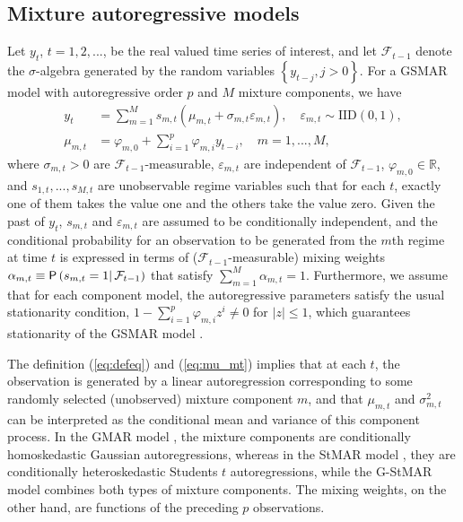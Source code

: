 \documentclass[nojss]{jss} %
\begin{document}
\subsection{Mixture autoregressive models}\label{sec:mar}
Let $y_t$, $t=1,2,...$, be the real valued time series of interest, and let $\mathcal{F}_{t-1}$ denote the $\sigma$-algebra generated by the random variables $\left\lbrace y_{t-j},j>0\right\rbrace$. For a GSMAR model with autoregressive order $p$ and $M$ mixture components, we have
%
\begin{align}
y_t &= \sum_{m=1}^{M}s_{m,t}(\mu_{m,t}+\sigma_{m,t}\varepsilon_{m,t}), \quad \varepsilon_{m,t}\sim\text{IID}(0,1), \label{eq:defeq}\\
\mu_{m,t} &= \varphi_{m,0}+\sum_{i=1}^{p}\varphi_{m,i}y_{t-i}, \quad m=1,...,M, \label{eq:mu_mt}
\end{align}
%
where $\sigma_{m,t}>0$ are $\mathcal{F}_{t-1}$-measurable, $\varepsilon_{m,t}$ are independent of $\mathcal{F}_{t-1}$, $\varphi_{m,0}\in\mathbb{R}$, and $s_{1,t},...,s_{M,t}$ are unobservable regime variables such that for each $t$, exactly one of them takes the value one and the others take the value zero. Given the past of $y_t$, $s_{m,t}$ and $\varepsilon_{m,t}$ are assumed to be conditionally independent, and the conditional probability for an observation to be generated from the $m$th regime at time $t$ is expressed in terms of ($\mathcal{F}_{t-1}$-measurable) mixing weights $\alpha_{m,t}\equiv \mathsf{P}\left(s_{m,t}=1\right|\mathcal{F}_{t-1})$ that satisfy $\sum_{m=1}^{M}\alpha_{m,t}=1$. Furthermore, we assume that for each component model, the autoregressive parameters satisfy the usual stationarity condition, $1-\sum_{i=1}^p\varphi_{m,i}z^i\neq0$ for $|z|\leq 1$, which guarantees stationarity of the GSMAR model \citep[Theorem 1]{Virolainen:2020}.

The definition (\ref{eq:defeq}) and (\ref{eq:mu_mt}) implies that at each $t$, the observation is generated by a linear autoregression corresponding to some randomly selected (unobserved) mixture component $m$, and that $\mu_{m,t}$ and $\sigma_{m,t}^2$ can be interpreted as the conditional mean and variance of this component process. In the GMAR model \citep{Kalliovirta+Meitz+Saikkonen:2015}, the mixture components are conditionally homoskedastic Gaussian autoregressions, whereas in the StMAR model \citep{Meitz+Preve+Saikkonen:2021}, they are conditionally heteroskedastic Students $t$ autoregressions, while the G-StMAR model \citep{Virolainen:2020} combines both types of mixture components. The mixing weights, on the other hand, are functions of the preceding $p$ observations.
\end{document}
